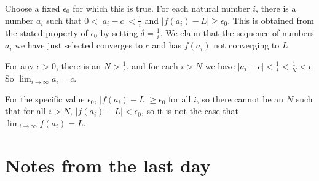 \documentclass[12pt]{article}
\begin{document}
\begin{description}
Choose a fixed $\epsilon_0$ for which this is true.  For each natural number $i$, there is a number $a_i$ such that $0<|a_i-c|<\frac 1i$ and $|f(a_i)-L|\geq \epsilon_0$.  This is obtained from the stated property of $\epsilon_0$
by setting $\delta=\frac1i$.  We claim that the sequence of numbers $a_i$ we have just selected converges to $c$ and has $f(a_i)$ not converging to $L$.

For any $\epsilon>0$, there is an $N>\frac1{\epsilon}$, and for each $i > N$ we have $|a_i-c|<\frac1i<\frac1N<\epsilon$.  So $\lim_{i \rightarrow \infty}a_i=c$.

For the specific value $\epsilon_0$, $|f(a_i)-L|\geq \epsilon_0$ for all $i$, so there cannot be an $N$ such that for all $i >N$, $|f(a_i)-L|<\epsilon_0$, so it is not the case that $\lim_{i \rightarrow \infty}f(a_i)=L$.


\end{description}

\section{Notes from the last day}
\end{document}
